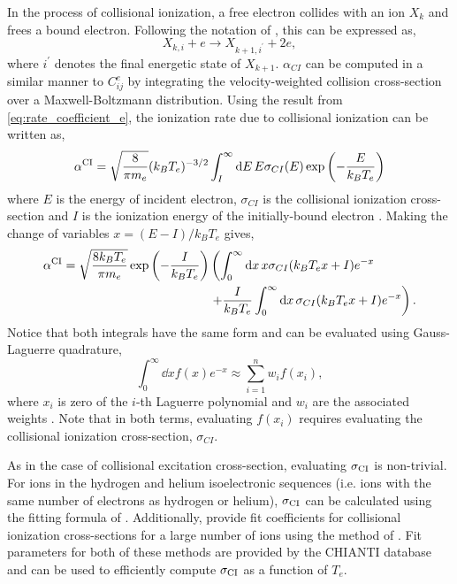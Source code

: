 In the process of collisional ionization, a free electron collides with an ion $X_k$ and frees a bound electron. Following the notation of \citet{bradshaw_collisional_2013,mason_spectroscopic_1994}, this can be expressed as,
\begin{equation}\label{eq:collisional_ionization}
    X_{k,i} + e \to X_{k+1,i^\prime} + 2e,
\end{equation}
where $i^\prime$ denotes the final energetic state of $X_{k+1}$. $\alpha_{CI}$ can be computed in a similar manner to $C^e_{ij}$ by integrating the velocity-weighted collision cross-section over a Maxwell-Boltzmann distribution. Using the result from \autoref{eq:rate_coefficient_e}, the ionization rate due to collisional ionization can be written as,
\begin{equation}
    \alpha^\textup{CI} = \sqrt{\frac{8}{\pi m_e}}(k_BT_e)^{-3/2}\int_I^{\infty}\textup{d}E\,E\sigma_{CI}(E)\exp{\left(-\frac{E}{k_BT_e}\right)}
\end{equation}
where $E$ is the energy of incident electron, $\sigma_{CI}$ is the collisional ionization cross-section and $I$ is the ionization energy of the initially-bound electron \citep{del_zanna_solar_2018}. Making the change of variables $x=(E-I)/k_BT_e$ gives,
\begin{equation}\label{eq:collisional_ionization_x}
\begin{aligned}
    \alpha^\textup{CI} = \sqrt{\frac{8k_BT_e}{\pi m_e}}\exp{\left(-\frac{I}{k_BT_e}\right)}&\left(\int_0^{\infty}\textup{d}x\,x\sigma_{CI}(k_BT_ex+I)e^{-x} \right. \\
    &\left. + \frac{I}{k_BT_e}\int_0^{\infty}\textup{d}x\,\sigma_{CI}(k_BT_ex+I)e^{-x}\right).
\end{aligned}
\end{equation}
Notice that both integrals have the same form and can be evaluated using Gauss-Laguerre quadrature,
\begin{equation}
    \int_0^\infty\dd{x}f(x)e^{-x} \approx \sum_{i=1}^n w_if(x_i),
\end{equation}
where $x_i$ is zero of the $i$-th Laguerre polynomial and $w_i$ are the associated weights \citep[see Equation 25.4.45 of][]{abramowitz_handbook_1972}. Note that in both terms, evaluating $f(x_i)$ requires evaluating the collisional ionization cross-section, $\sigma_{CI}$.

As in the case of collisional excitation cross-section, evaluating $\sigma_\textup{CI}$ is non-trivial. For ions in the hydrogen and helium isoelectronic sequences (i.e. ions with the same number of electrons as hydrogen or helium), $\sigma_\textup{CI}$ can be calculated using the fitting formula of \citet{fontes_fully_1999}. Additionally, \citet{dere_ionization_2007} provide fit coefficients for collisional ionization cross-sections for a large number of ions using the method of \citet{burgess_analysis_1992}. Fit parameters for both of these methods are provided by the CHIANTI database and can be used to efficiently compute $\sigma_\textup{CI}$ as a function of $T_e$.

